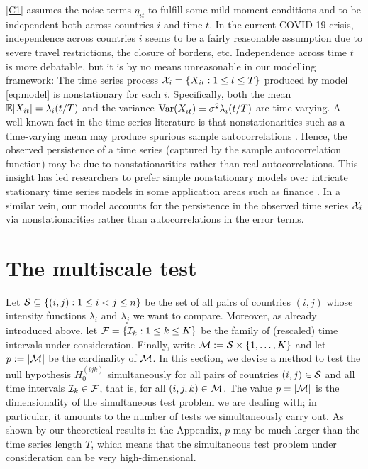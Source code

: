 \documentclass[a4paper,12pt]{article}
\numberwithin{equation}{section}
\begin{document}
\ref{C1} assumes the noise terms $\eta_{it}$ to fulfill some mild moment conditions and to be independent both across countries $i$ and time $t$. In the current COVID-19 crisis, independence across countries $i$ seems to be a fairly reasonable assumption due to severe travel restrictions, the closure of borders, etc. Independence across time $t$ is more debatable, but it is by no means unreasonable in our modelling framework: The time series process $\mathcal{X}_i = \{X_{it}: 1 \le t \le T\}$ produced by model \eqref{eq:model} is nonstationary for each $i$. Specifically, both the mean $\mathbb{E}[X_{it}] = \lambda_i(t/T)$ and the variance $\textnormal{Var}(X_{it}) = \sigma^2 \lambda_i(t/T)$ are time-varying. A well-known fact in the time series literature is that nonstationarities such as a time-varying mean may produce spurious sample autocorrelations \citep[cp.\ for example][]{MikoschStarica2004, Fryzlewicz2008}. Hence, the observed persistence of a time series (captured by the sample autocorrelation function) may be due to nonstationarities rather than real autocorrelations. This insight has led researchers to prefer simple nonstationary models over intricate stationary time series models in some application areas such as finance \citep[cp.][]{MikoschStarica2000, MikoschStarica2004, Fryzlewicz2006}. In a similar vein, our model accounts for the persistence in the observed time series $\mathcal{X}_i$ via nonstationarities rather than autocorrelations in the error terms. 

 

\section{The multiscale test}\label{sec:test}


Let $\mathcal{S} \subseteq \{ (i,j): 1 \le i < j \le n \}$ be the set of all pairs of countries $(i,j)$ whose intensity functions $\lambda_i$ and $\lambda_j$ we want to compare. Moreover, as already introduced above, let $\mathcal{F} = \{ \mathcal{I}_k: 1 \le k \le K \}$ be the family of (rescaled) time intervals under consideration. Finally, write $\mathcal{M} := \mathcal{S} \times \{1,\ldots,K\}$ and let $p := |\mathcal{M}|$ be the cardinality of $\mathcal{M}$. In this section, we devise a method to test the null hypothesis $H_0^{(ijk)}$ simultaneously for all pairs of countries $(i,j) \in \mathcal{S}$ and all time intervals $\mathcal{I}_k \in \mathcal{F}$, that is, for all $(i,j,k) \in \mathcal{M}$. The value $p = |\mathcal{M}|$ is the dimensionality of the simultaneous test problem we are dealing with; in particular, it amounts to the number of tests we simultaneously carry out. As shown by our theoretical results in the Appendix, $p$ may be much larger than the time series length $T$, which means that the simultaneous test problem under consideration can be very high-dimensional. 
\end{document}
